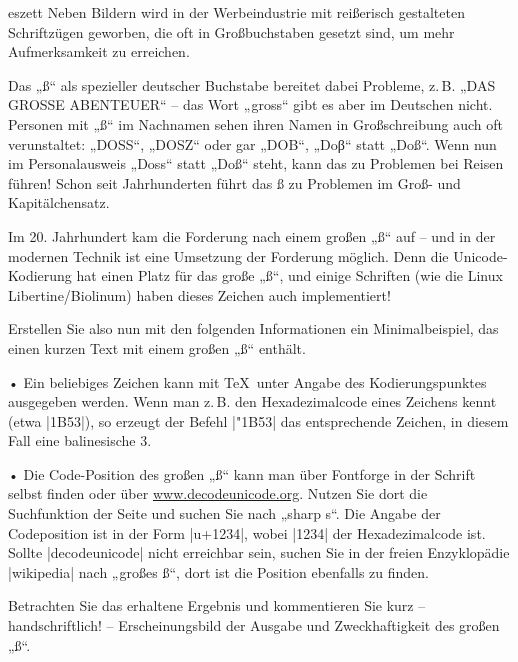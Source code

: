 \documentclass[
	solution,
	blatt=7,
	ausgabe=28.\,05.\,2010,
	rückgabe=03.\,06.\,2010
]{lcourse-hd}
\begin{document}
\begin{exercise}[
  name={Typographischer Exkurs: \fontspec{Linux Biolinum}\Large ẞ},
  punkte=3,
  abgabe = Quellcode per Mail und Quellcode ausgedruckt. Handschriftlicher Kommentar.]{eszett}
Neben Bildern wird in der Werbeindustrie mit reißerisch gestalteten Schriftzügen geworben, die oft in Großbuchstaben gesetzt sind, um mehr Aufmerksamkeit zu erreichen.

Das „ß“ als spezieller deutscher Buchstabe bereitet dabei Probleme, z.\,B. „DAS GROSSE ABENTEUER“ – das Wort „gross“ gibt es aber im Deutschen nicht. Personen mit „ß“ im Nachnamen sehen ihren Namen in Großschreibung auch oft verunstaltet: „DOSS“, „DOSZ“ oder gar „DOB“, „Doβ“ statt „Doß“. Wenn nun im Personalausweis „Doss“ statt „Doß“ steht, kann das zu Problemen bei Reisen führen! Schon seit Jahrhunderten führt das ß zu Problemen im Groß- und Kapitälchensatz.

Im 20. Jahrhundert kam die Forderung nach einem großen „ß“ auf – und in der modernen Technik ist eine Umsetzung der Forderung möglich. Denn die Unicode-Kodierung hat einen Platz für das große „ß“, und einige Schriften (wie die Linux Libertine/Biolinum) haben dieses Zeichen auch implementiert!

Erstellen Sie also nun mit den folgenden Informationen ein Minimalbeispiel, das einen kurzen Text mit einem großen „ß“ enthält.

• Ein beliebiges Zeichen kann mit \TeX\ unter Angabe des Kodierungspunktes ausgegeben werden. Wenn man z.\,B. den Hexadezimalcode eines Zeichens kennt (etwa |1B53|), so erzeugt der Befehl |\char"1B53| das entsprechende Zeichen, in diesem Fall eine balinesische 3.

• Die Code-Position des großen „ß“ kann man über Fontforge in der Schrift selbst finden oder über \url{www.decodeunicode.org}. Nutzen Sie dort die Suchfunktion der Seite und suchen Sie nach „sharp s“. Die Angabe der Codeposition ist in der Form |u+1234|, wobei |1234| der Hexadezimalcode ist. Sollte |decodeunicode| nicht erreichbar sein, suchen Sie in der freien Enzyklopädie |wikipedia| nach „großes ß“, dort ist die Position ebenfalls zu finden.

Betrachten Sie das erhaltene Ergebnis und kommentieren Sie kurz – handschriftlich! – Erscheinungsbild der Ausgabe und Zweckhaftigkeit des großen „ß“.
\end{exercise}
\end{document}
